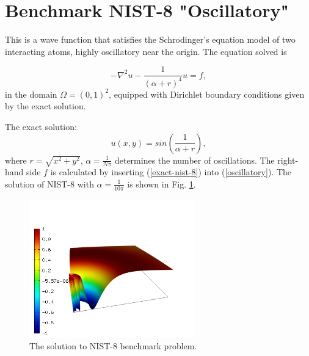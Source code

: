 \section{Benchmark NIST-8 "Oscillatory"}
\label{sec:bench-8}

This is a wave function that satisfies the Schrodinger's equation model of two
interacting atoms, highly oscillatory near the origin.
The equation solved is

\begin{equation} \label{oscillatory}
-\nabla^{2} u - \frac{1}{(\alpha + r)^{4}} u = f,
\end{equation}
in the domain $\Omega = (0, 1)^2$, equipped with Dirichlet boundary conditions
given by the exact solution.

The exact solution:
\begin{equation}\label{exact-nist-8}
u(x,y) = sin(\frac{1}{\alpha + r}),
\end{equation}
where $r = \sqrt{x^{2} + y^{2}}$, $\alpha = \frac{1}{N \pi}$ determines the number of oscillations.
The right-hand side $f$ is calculated by inserting (\ref{exact-nist-8}) into (\ref{oscillatory}).
The solution of NIST-8 with $\alpha = \frac{1}{10 \pi}$ is shown in Fig. \ref{fig:sln-nist08}.

\begin{figure}[!ht]
\centering
\includegraphics[height=6cm]{nist/nist-8/solution.png}
\caption{The solution to NIST-8 benchmark problem.}
\label{fig:sln-nist08}
\end{figure}
